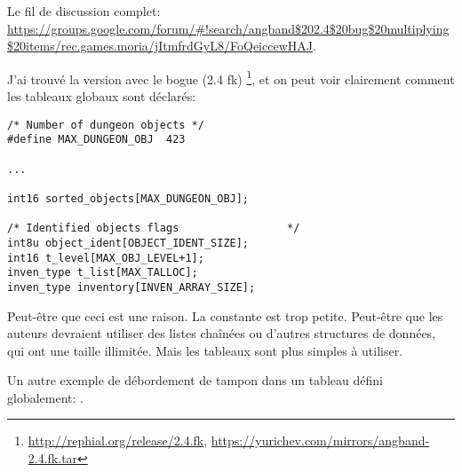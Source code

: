 Le fil de discussion complet: \url{https://groups.google.com/forum/#!search/angband$202.4$20bug$20multiplying$20items/rec.games.moria/jItmfrdGyL8/FoQeiccewHAJ}.

J'ai trouvé la version avec le bogue (2.4 fk)
\footnote{\url{http://rephial.org/release/2.4.fk}, \url{https://yurichev.com/mirrors/angband-2.4.fk.tar}},
et on peut voir clairement comment les tableaux globaux sont déclarés:

\begin{lstlisting}[style=customc]
/* Number of dungeon objects */
#define MAX_DUNGEON_OBJ  423

...

int16 sorted_objects[MAX_DUNGEON_OBJ];

/* Identified objects flags					*/
int8u object_ident[OBJECT_IDENT_SIZE];
int16 t_level[MAX_OBJ_LEVEL+1];
inven_type t_list[MAX_TALLOC];
inven_type inventory[INVEN_ARRAY_SIZE];
\end{lstlisting}

Peut-être que ceci est une raison. La constante  est trop petite.
Peut-être que les auteurs devraient utiliser des listes chaînées ou d'autres structures
de données, qui ont une taille illimitée.
Mais les tableaux sont plus simples à utiliser.

Un autre exemple de débordement de tampon dans un tableau défini globalement: .

